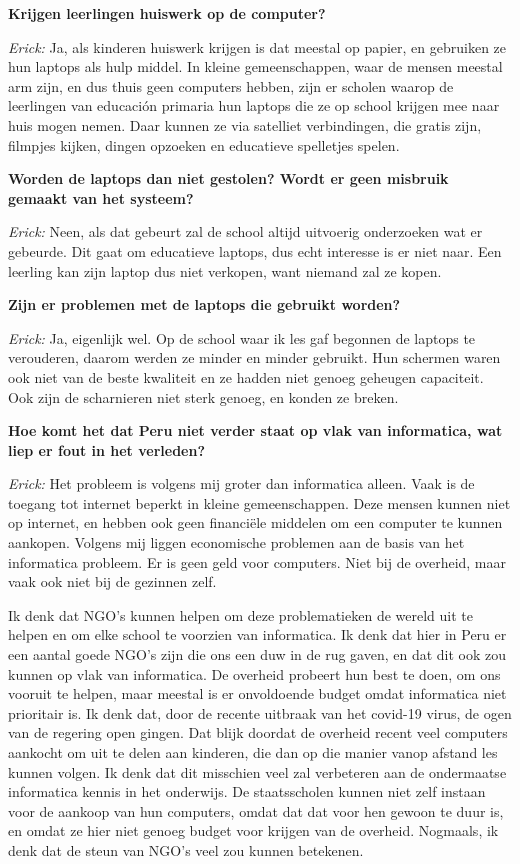 \textbf{Krijgen leerlingen huiswerk op de computer?}

\textit{Erick:} Ja, als kinderen huiswerk krijgen is dat meestal op papier, en gebruiken ze hun laptops als hulp middel. In kleine gemeenschappen, waar de mensen meestal arm zijn, en dus thuis geen computers hebben, zijn er scholen waarop de leerlingen van educación primaria hun laptops die ze op school krijgen mee naar huis mogen nemen. Daar kunnen ze via satelliet verbindingen, die gratis zijn, filmpjes kijken, dingen opzoeken en educatieve spelletjes spelen. 

\textbf{Worden de laptops dan niet gestolen? Wordt er geen misbruik gemaakt van het systeem?}

\textit{Erick:} Neen, als dat gebeurt zal de school altijd uitvoerig onderzoeken wat er gebeurde. Dit gaat om educatieve laptops, dus echt interesse is er niet naar. Een leerling kan zijn laptop dus niet verkopen, want niemand zal ze kopen. 

\textbf{Zijn er problemen met de laptops die gebruikt worden?}

\textit{Erick:} Ja, eigenlijk wel. Op de school waar ik les gaf begonnen de laptops te verouderen, daarom werden ze minder en minder gebruikt. Hun schermen waren ook niet van de beste kwaliteit en ze hadden niet genoeg geheugen capaciteit. Ook zijn de scharnieren niet sterk genoeg, en konden ze breken.

\textbf{Hoe komt het dat Peru niet verder staat op vlak van informatica, wat liep er fout in het verleden?}

\textit{Erick:} Het probleem is volgens mij groter dan informatica alleen. Vaak is de toegang tot internet beperkt in kleine gemeenschappen. Deze mensen kunnen niet op internet, en hebben ook geen financiële middelen om een computer te kunnen aankopen. Volgens mij liggen economische problemen aan de basis van het informatica probleem. Er is geen geld voor computers. Niet bij de overheid, maar vaak ook niet bij de gezinnen zelf. 

Ik denk dat NGO's kunnen helpen om deze problematieken de wereld uit te helpen en om elke school te voorzien van informatica. Ik denk dat hier in Peru er een aantal goede NGO's zijn die ons een duw in de rug gaven, en dat dit ook zou kunnen op vlak van informatica. De overheid probeert hun best te doen, om ons vooruit te helpen, maar meestal is er onvoldoende budget omdat informatica niet prioritair is. Ik denk dat, door de recente uitbraak van het covid-19 virus, de ogen van de regering open gingen. Dat blijk doordat de overheid recent veel computers aankocht om uit te delen aan kinderen, die dan op die manier vanop afstand les kunnen volgen. Ik denk dat dit misschien veel zal verbeteren aan de ondermaatse informatica kennis in het onderwijs. De staatsscholen kunnen niet zelf instaan voor de aankoop van hun computers, omdat dat dat voor hen gewoon te duur is, en omdat ze hier niet genoeg budget voor krijgen van de overheid. Nogmaals, ik denk dat de steun van NGO's veel zou kunnen betekenen.

